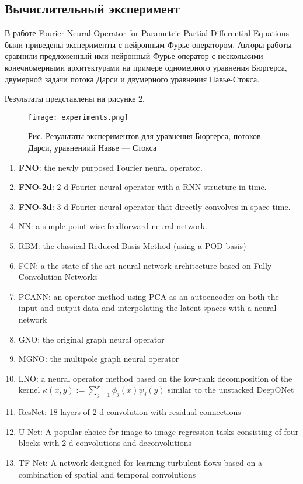 \subsection{Вычислительный эксперимент}
В работе Fourier Neural Operator for Parametric Partial Differential Equations были приведены эксперименты с нейронным Фурье оператором. Авторы работы сравнили предложенный ими нейронный Фурье оператор с несколькими конечномерными архитектурами на примере одномерного уравнения Бюргерса, двумерной задачи потока Дарси и двумерного уравнения Навье-Стокса.

Результаты представлены на рисунке 2.
\begin{figure}[h]
	\centering
	\texttt{[image: experiments.png]}
	\caption{Рис. Результаты экспериментов для уравнения Бюргерса, потоков Дарси, уравнениий Навье — Стокса}
\end{figure}

\begin{enumerate}
	\item \textbf{FNO}: the newly purposed Fourier neural operator.
	\item \textbf{FNO-2d}: 2-d Fourier neural operator with a RNN structure in time.
	\item \textbf{FNO-3d}: 3-d Fourier neural operator that directly convolves in space-time.
	\item NN: a simple point-wise feedforward neural network.
	\item RBM: the classical Reduced Basis Method (using a POD basis) 
	\item FCN: a the-state-of-the-art neural network architecture based on Fully Convolution Networks
	\item PCANN: an operator method using PCA as an autoencoder on both the input and output data and interpolating the latent spaces with a neural network
	\item GNO: the original graph neural operator
	\item MGNO: the multipole graph neural operator
	\item LNO: a neural operator method based on the low-rank decomposition of the kernel $\kappa(x, y):=\sum_{j=1}^{r} \phi_{j}(x) \psi_{j}(y)$ similar to the unstacked DeepONet
	\item ResNet: 18 layers of 2-d convolution with residual connections
	\item U-Net: A popular choice for image-to-image regression tasks consisting of four blocks with 2-d convolutions and deconvolutions
	\item TF-Net: A network designed for learning turbulent flows based on a combination of spatial and temporal convolutions 
	
\end{enumerate}


